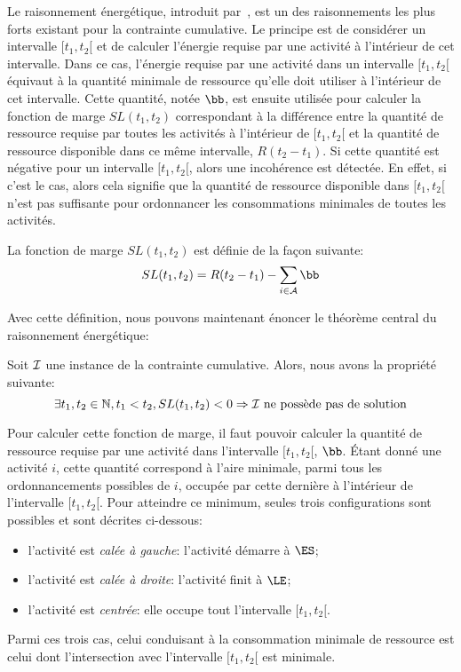 Le raisonnement énergétique, introduit par~\cite{RELopez}, est un des
raisonnements les plus forts existant pour la contrainte
cumulative. Le principe est de considérer un intervalle $[t_1,t_2[$ et
de calculer l'énergie requise par une activité à l'intérieur de cet
intervalle. Dans ce cas, l'énergie requise par une activité dans un
intervalle $[t_1,t_2[$  équivaut à
la quantité minimale de ressource qu'elle doit utiliser
à l'intérieur de cet intervalle. Cette quantité, notée $\bb$, est
ensuite utilisée pour calculer la fonction de marge $SL(t_1,t_2)$
correspondant à la différence entre la quantité de ressource requise
par toutes les activités à l'intérieur de $[t_1,t_2[$ et la quantité
de ressource disponible dans ce même intervalle, $R (t_2-t_1)$. Si
cette quantité est négative pour un intervalle $[t_1,t_2[$, alors une
incohérence est détectée. En effet, si c'est le cas, alors cela
signifie que la quantité de ressource disponible dans $[t_1,t_2[$
n'est pas suffisante pour ordonnancer les consommations minimales de
toutes les activités.

\begin{defi}
La fonction de marge $SL(t_1,t_2)$ est définie de la façon suivante: 
\[  SL(t_1,t_2) = R (t_2-t_1) - \sum_{i \in \A} \bb \]
\end{defi}

Avec cette définition, nous pouvons maintenant énoncer le théorème
central du raisonnement énergétique:
 
\begin{theo}
\label{th:centerRE}
Soit ${\cal I}$ une instance de la contrainte cumulative. Alors, nous avons
la propriété suivante:
\begin{equation}
\exists t_1,t_2 \in \mathbb{N}, t_1 < t_2, SL(t_1,t_2) <0 \Rightarrow {\cal I}
\text{ ne possède pas de solution}
\label{eq:centerRE}
\end{equation}
\end{theo}

Pour calculer cette fonction de marge, il faut pouvoir calculer la
quantité de ressource requise par une activité dans l'intervalle
$[t_1,t_2[$, $\bb$. {\'E}tant donné une activité $i$, cette quantité
correspond à l'aire minimale, parmi tous les ordonnancements possibles
de $i$, occupée par cette dernière à l'intérieur de l'intervalle
$[t_1,t_2[$. Pour atteindre ce minimum, seules trois configurations
sont possibles et sont décrites ci-dessous:
\begin{itemize}
\item l'activité est {\it calée à gauche}: l'activité démarre à $\ES$; 
\item l'activité est {\it  calée à droite}: l'activité finit à $\LE$;
\item l'activité est {\it centrée}: elle occupe tout l'intervalle
  $[t_1,t_2[$.
\end{itemize}
Parmi ces trois cas, celui conduisant à la consommation minimale de
ressource est celui dont l'intersection avec l'intervalle $[t_1,t_2[$
est minimale.

